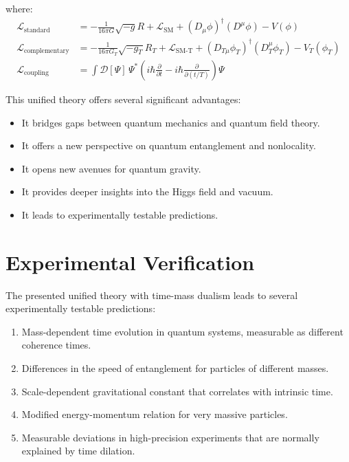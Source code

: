 \documentclass{article}
\begin{document}
	where:
	\begin{align}
		\mathcal{L}_\text{standard} &= -\frac{1}{16\pi G} \sqrt{-g} R + \mathcal{L}_\text{SM} + (D_\mu \phi)^\dagger (D^\mu \phi) - V(\phi) \\
		\mathcal{L}_\text{complementary} &= -\frac{1}{16\pi G_T} \sqrt{-g_T} R_T + \mathcal{L}_\text{SM-T} + (D_{T\mu} \phi_T)^\dagger (D_T^\mu \phi_T) - V_T(\phi_T) \\
		\mathcal{L}_\text{coupling} &= \int \mathcal{D}[\Psi] \, \Psi^* \left( i\hbar \frac{\partial}{\partial t} - i\hbar \frac{\partial}{\partial (t/T)} \right) \Psi
	\end{align}
	
	This unified theory offers several significant advantages:
	\begin{itemize}
		\item It bridges gaps between quantum mechanics and quantum field theory.
		\item It offers a new perspective on quantum entanglement and nonlocality.
		\item It opens new avenues for quantum gravity.
		\item It provides deeper insights into the Higgs field and vacuum.
		\item It leads to experimentally testable predictions.
	\end{itemize}
	
	\section{Experimental Verification}
	
	The presented unified theory with time-mass dualism leads to several experimentally testable predictions:
	
	\begin{enumerate}
		\item Mass-dependent time evolution in quantum systems, measurable as different coherence times.
		\item Differences in the speed of entanglement for particles of different masses.
		\item Scale-dependent gravitational constant that correlates with intrinsic time.
		\item Modified energy-momentum relation for very massive particles.
		\item Measurable deviations in high-precision experiments that are normally explained by time dilation.
	\end{enumerate}
	
\end{document}
